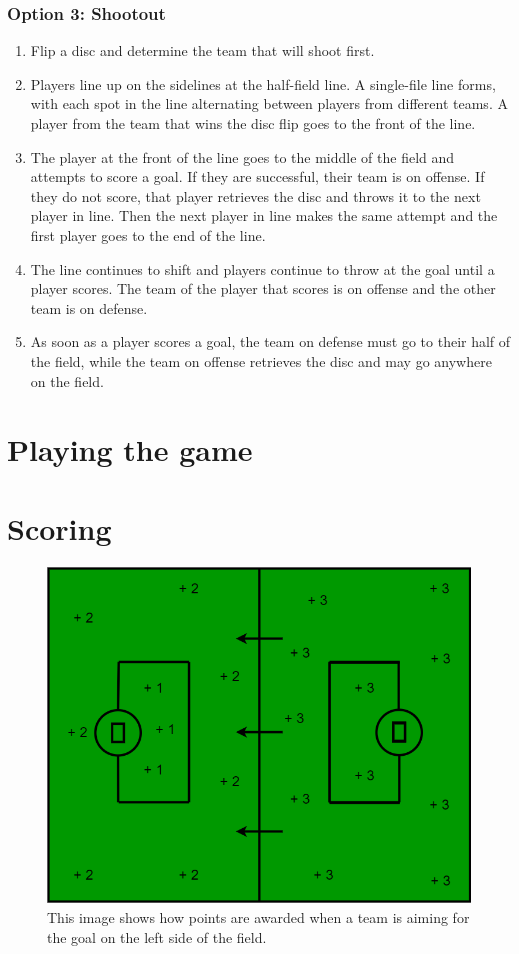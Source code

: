 \documentclass[10pt]{article}
\begin{document}
        \subsubsection{Option 3: Shootout}
            \begin{enumerate}
                \item Flip a disc and determine the team that will shoot first.
                \item Players line up on the sidelines at the half-field line. A single-file line forms, with each spot in the line alternating between players from different teams. A player from the team that wins the disc flip goes to the front of the line.
                \item The player at the front of the line goes to the middle of the field and attempts to score a goal. If they are successful, their team is on offense. If they do not score, that player retrieves the disc and throws it to the next player in line. Then the next player in line makes the same attempt and the first player goes to the end of the line. 
                \item The line continues to shift and players continue to throw at the goal until a player scores. The team of the player that scores is on offense and the other team is on defense.
                \item As soon as a player scores a goal, the team on defense must go to their half of the field, while the team on offense retrieves the disc and may go anywhere on the field.
            \end{enumerate}

    \section{Playing the game}

    \section{Scoring}

        \begin{figure}[H]

            \includegraphics[width=.75\textwidth]{field/field_points}
            \caption{This image shows how points are awarded when a team is aiming for the goal on the left side of the field.}

        \end{figure}
\end{document}
